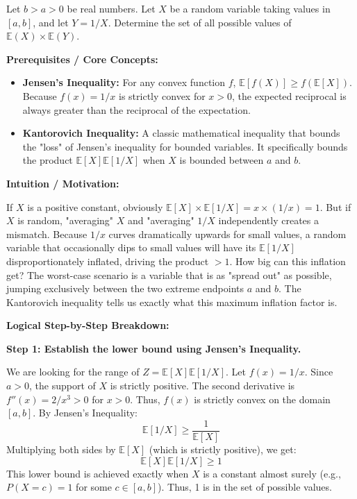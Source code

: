 \begin{exercise}\label{probability:2016:4}
Let $b > a > 0$ be real numbers. Let $X$ be a random variable taking values in $[a,b]$, and let $Y = 1/X$. Determine the set of all possible values of $\mathbb{E}(X) \times \mathbb{E}(Y)$.
\end{exercise}
\begin{solution}
\textbf{Prerequisites / Core Concepts:}
\begin{itemize}
    \item \textbf{Jensen's Inequality:} For any convex function $f$, $\mathbb{E}[f(X)] \geq f(\mathbb{E}[X])$. Because $f(x) = 1/x$ is strictly convex for $x > 0$, the expected reciprocal is always greater than the reciprocal of the expectation.
    \item \textbf{Kantorovich Inequality:} A classic mathematical inequality that bounds the "loss" of Jensen's inequality for bounded variables. It specifically bounds the product $\mathbb{E}[X]\mathbb{E}[1/X]$ when $X$ is bounded between $a$ and $b$.
\end{itemize}

\textbf{Intuition / Motivation:}

If $X$ is a positive constant, obviously $\mathbb{E}[X] \times \mathbb{E}[1/X] = x \times (1/x) = 1$. But if $X$ is random, "averaging" $X$ and "averaging" $1/X$ independently creates a mismatch. Because $1/x$ curves dramatically upwards for small values, a random variable that occasionally dips to small values will have its $\mathbb{E}[1/X]$ disproportionately inflated, driving the product $> 1$. How big can this inflation get? The worst-case scenario is a variable that is as "spread out" as possible, jumping exclusively between the two extreme endpoints $a$ and $b$. The Kantorovich inequality tells us exactly what this maximum inflation factor is.

\textbf{Logical Step-by-Step Breakdown:}

\textbf{Step 1: Establish the lower bound using Jensen's Inequality.}

We are looking for the range of $Z = \mathbb{E}[X] \mathbb{E}[1/X]$.
Let $f(x) = 1/x$. Since $a > 0$, the support of $X$ is strictly positive.
The second derivative is $f''(x) = 2/x^3 > 0$ for $x > 0$. Thus, $f(x)$ is strictly convex on the domain $[a,b]$.
By Jensen's Inequality:
\[ \mathbb{E}[1/X] \geq \frac{1}{\mathbb{E}[X]} \]
Multiplying both sides by $\mathbb{E}[X]$ (which is strictly positive), we get:
\[ \mathbb{E}[X] \mathbb{E}[1/X] \geq 1 \]
This lower bound is achieved exactly when $X$ is a constant almost surely (e.g., $P(X=c) = 1$ for some $c \in [a,b]$). Thus, 1 is in the set of possible values.


\end{solution}
